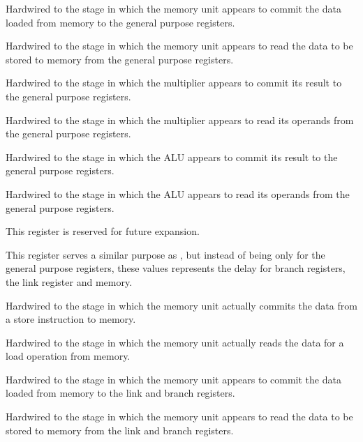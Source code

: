 \reset{****}
Hardwired to the stage in which the memory unit appears to commit the data
loaded from memory to the general purpose registers.

\reset{****}
Hardwired to the stage in which the memory unit appears to read the data to be
stored to memory from the general purpose registers.

\reset{****}
Hardwired to the stage in which the multiplier appears to commit its result to
the general purpose registers.

\reset{****}
Hardwired to the stage in which the multiplier appears to read its operands from
the general purpose registers.

\reset{****}
Hardwired to the stage in which the ALU appears to commit its result to the
general purpose registers.

\reset{****}
Hardwired to the stage in which the ALU appears to read its operands from the
general purpose registers.


This register is reserved for future expansion.


This register serves a similar purpose as , but instead of being only
for the general purpose registers, these values represents the delay for branch
registers, the link register and memory.

\reset{****}
Hardwired to the stage in which the memory unit actually commits the data from
a store instruction to memory.

\reset{****}
Hardwired to the stage in which the memory unit actually reads the data for a
load operation from memory.

\reset{****}
Hardwired to the stage in which the memory unit appears to commit the data
loaded from memory to the link and branch registers.

\reset{****}
Hardwired to the stage in which the memory unit appears to read the data to be
stored to memory from the link and branch registers.

